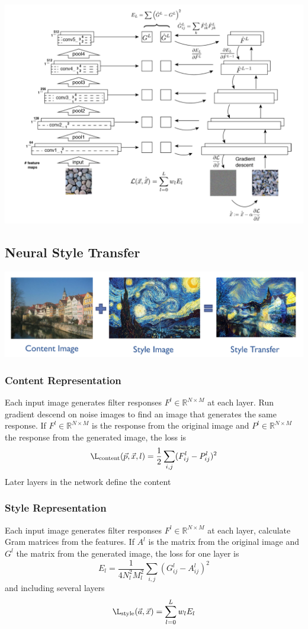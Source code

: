 \documentclass[x11names,11pt,a4paper]{article}
\theoremstyle{definition}
\newcommand*\R{\mathbb{R}}
\begin{document}
\begin{center}
	\includegraphics[width=0.8\linewidth]{img/conditional_GAN_texture_generation}
\end{center}

\subsection{Neural Style Transfer}
\begin{center}
	\includegraphics[width=0.7\linewidth]{img/conditional_GAN_style_transfer}
\end{center}

\subsubsection{Content Representation}
Each input image generates filter responses $F^l \in \R^{N\times M}$ at each layer. Run gradient descend on noise images to find an image that generates the same response. If $F^l \in \R^{N\times M}$ is the response from the original image and $P^l \in \R^{N\times M}$ the response from the generated image, the loss is
\begin{equation*}
	\L_{\text{content}}(\vec{p},\vec{x},l) = \frac{1}{2} \sum_{i,j} (F_{ij}^l - P_{ij}^l)^2
\end{equation*}
Later layers in the network define the content

\subsubsection{Style Representation}
Each input image generates filter responses $F^l \in \R^{N\times M}$ at each layer, calculate Gram matrices from the features. If $A^l$ is the matrix from the original  image and $G^l$ the matrix from the generated image, the loss for one layer is
\begin{equation*}
	E_l = \frac{1}{4 N_l^2 M_l^2}\sum_{i,j}(G_{ij}^l - A_{ij}^l)^2
\end{equation*}
and including several layers
\begin{equation*}
	\L_{\text{style}}(\vec{a},\vec{x}) = \sum_{l=0}^{L}w_l E_l
\end{equation*}
\end{document}
